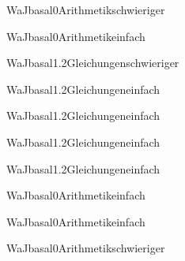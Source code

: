 \documentclass[12pt]{article}
\begin{document}
\begin{Add}{WaJ}{basal0}{Arithmetik}{schwieriger}
\end{Add}

\begin{Add}{WaJ}{basal0}{Arithmetik}{einfach}
\end{Add}

\begin{Add}{WaJ}{basal1.2}{Gleichungen}{schwieriger}
\end{Add}

\begin{Add}{WaJ}{basal1.2}{Gleichungen}{einfach}
\end{Add}

\begin{Add}{WaJ}{basal1.2}{Gleichungen}{einfach}
\end{Add}

\begin{Add}{WaJ}{basal1.2}{Gleichungen}{einfach}
\end{Add}

\begin{Add}{WaJ}{basal1.2}{Gleichungen}{einfach}
\end{Add}

\begin{Add}{WaJ}{basal0}{Arithmetik}{einfach}
\end{Add}

\begin{Add}{WaJ}{basal0}{Arithmetik}{einfach}
\end{Add}

\begin{Add}{WaJ}{basal0}{Arithmetik}{schwieriger}
\end{Add}
\end{document}
